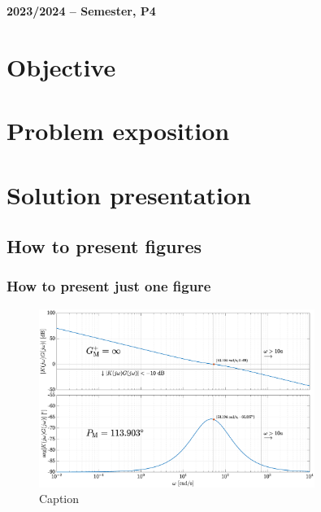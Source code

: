 \documentclass[12pt]{article}
\begin{document}
\begin{center}
    \large \bf 2023/2024 --  Semester, P4
\end{center}

\thispagestyle{empty}

\setcounter{page}{0}

\newpage

\tableofcontents 

\newpage

\section{Objective}

\lipsum[1] \cite{refs1}

\section{Problem exposition} 

\lipsum[1] \cite{refs2}

\lipsum[2-3]

\newpage

\section{Solution presentation}

\subsection{How to present figures}

\subsubsection{How to present just one figure}

\begin{figure}[H]
	\begin{center}
 		\includegraphics[width = 0.8\textwidth]{Images/Image.eps}
 		\caption{Caption}
 		\label{fig:1}
	\end{center} 
\end{figure}
\end{document}

